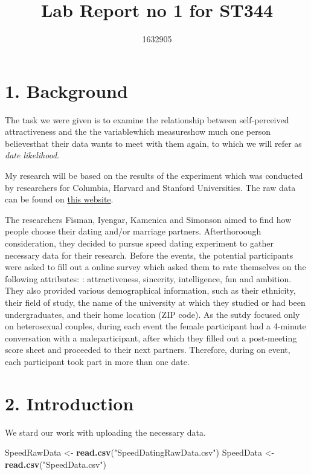 \documentclass[]{article}
\title{Lab Report no 1 for ST344}
\author{1632905}
\date{}
\newenvironment{Shaded}{\begin{snugshade}}{\end{snugshade}}
\newcommand{\KeywordTok}[1]{\textcolor[rgb]{0.13,0.29,0.53}{\textbf{#1}}}
\newcommand{\NormalTok}[1]{#1}
\newcommand{\StringTok}[1]{\textcolor[rgb]{0.31,0.60,0.02}{#1}}
\begin{document}
\maketitle

\hypertarget{background}{%
\section{1. Background}\label{background}}

The task we were given is to examine the relationship between
self-perceived attractiveness and the the variablewhich measureshow much
one person believesthat their data wants to meet with them again, to
which we will refer as \emph{date likelihood}.

My research will be based on the results of the experiment which was
conducted by researchers for Columbia, Harvard and Stanford
Universities. The raw data can be found on
\href{http://www.stat.columbia.edu/~gelman/arm/examples/speed.dating/}{this
website}.

The researchers Fisman, Iyengar, Kamenica and Simonson aimed to find how
people choose their dating and/or marriage partners. Afterthoroough
consideration, they decided to pursue speed dating experiment to gather
necessary data for their research. Before the events, the potential
participants were asked to fill out a online survey which asked them to
rate themselves on the following attributes: : attractiveness,
sincerity, intelligence, fun and ambition. They also provided various
demographical information, such as their ethnicity, their field of
study, the name of the university at which they studied or had been
undergraduates, and their home location (ZIP code). As the sutdy focused
only on heterosexual couples, during each event the female participant
had a 4-minute conversation with a maleparticipant, after which they
filled out a post-meeting score sheet and proceeded to their next
partners. Therefore, during on event, each participant took part in more
than one date.

\hypertarget{introduction}{%
\section{2. Introduction}\label{introduction}}

We stard our work with uploading the necessary data.

\begin{Shaded}
\begin{Highlighting}[]
\NormalTok{SpeedRawData <-}\StringTok{ }\KeywordTok{read.csv}\NormalTok{(}\StringTok{"SpeedDatingRawData.csv"}\NormalTok{)}
\NormalTok{SpeedData <-}\StringTok{ }\KeywordTok{read.csv}\NormalTok{(}\StringTok{"SpeedData.csv"}\NormalTok{)}
\end{Highlighting}
\end{Shaded}
\end{document}
